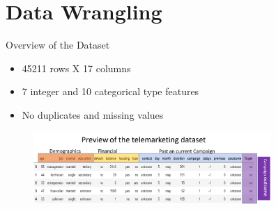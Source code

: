 \section{Data Wrangling} %

\begin{frame}{Overview of the Dataset}

\begin{itemize}
    \item 45211 rows X 17 columns
    \item 7 integer and 10 categorical type features
	\item No duplicates and missing values
\end{itemize}

	\begin{figure}
		
		\includegraphics[width=9.0cm]{figures/fig_bank_dataset.png}
	\end{figure}


\end{frame}

